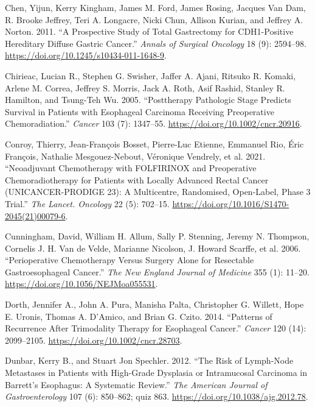 \documentclass[
  letterpaper,
]{scrbook}
\newlength{\cslhangindent}
\newenvironment{CSLReferences}[2] %
 {\begin{list}{}{%
  \setlength{\itemindent}{0pt}
  \setlength{\leftmargin}{0pt}
  \setlength{\parsep}{0pt}
  \ifodd #1
   \setlength{\leftmargin}{\cslhangindent}
   \setlength{\itemindent}{-1\cslhangindent}
  \fi
  \setlength{\itemsep}{#2\baselineskip}}}
 {\end{list}}
\begin{document}
\begin{CSLReferences}{1}{0}
Chen, Yijun, Kerry Kingham, James M. Ford, James Rosing, Jacques Van
Dam, R. Brooke Jeffrey, Teri A. Longacre, Nicki Chun, Allison Kurian,
and Jeffrey A. Norton. 2011. {``A Prospective Study of Total Gastrectomy
for {CDH1}-Positive Hereditary Diffuse Gastric Cancer.''} \emph{Annals
of Surgical Oncology} 18 (9): 2594--98.
\url{https://doi.org/10.1245/s10434-011-1648-9}.

Chirieac, Lucian R., Stephen G. Swisher, Jaffer A. Ajani, Ritsuko R.
Komaki, Arlene M. Correa, Jeffrey S. Morris, Jack A. Roth, Asif Rashid,
Stanley R. Hamilton, and Tsung-Teh Wu. 2005. {``Posttherapy Pathologic
Stage Predicts Survival in Patients with Esophageal Carcinoma Receiving
Preoperative Chemoradiation.''} \emph{Cancer} 103 (7): 1347--55.
\url{https://doi.org/10.1002/cncr.20916}.

Conroy, Thierry, Jean-François Bosset, Pierre-Luc Etienne, Emmanuel Rio,
Éric François, Nathalie Mesgouez-Nebout, Véronique Vendrely, et al.
2021. {``Neoadjuvant Chemotherapy with {FOLFIRINOX} and Preoperative
Chemoradiotherapy for Patients with Locally Advanced Rectal Cancer
({UNICANCER}-{PRODIGE} 23): A Multicentre, Randomised, Open-Label, Phase
3 Trial.''} \emph{The Lancet. Oncology} 22 (5): 702--15.
\url{https://doi.org/10.1016/S1470-2045(21)00079-6}.

Cunningham, David, William H. Allum, Sally P. Stenning, Jeremy N.
Thompson, Cornelis J. H. Van de Velde, Marianne Nicolson, J. Howard
Scarffe, et al. 2006. {``Perioperative Chemotherapy Versus Surgery Alone
for Resectable Gastroesophageal Cancer.''} \emph{The New England Journal
of Medicine} 355 (1): 11--20.
\url{https://doi.org/10.1056/NEJMoa055531}.

Dorth, Jennifer A., John A. Pura, Manisha Palta, Christopher G. Willett,
Hope E. Uronis, Thomas A. D'Amico, and Brian G. Czito. 2014. {``Patterns
of Recurrence After Trimodality Therapy for Esophageal Cancer.''}
\emph{Cancer} 120 (14): 2099--2105.
\url{https://doi.org/10.1002/cncr.28703}.

Dunbar, Kerry B., and Stuart Jon Spechler. 2012. {``The Risk of
Lymph-Node Metastases in Patients with High-Grade Dysplasia or
Intramucosal Carcinoma in {Barrett}'s Esophagus: A Systematic Review.''}
\emph{The American Journal of Gastroenterology} 107 (6): 850--862; quiz
863. \url{https://doi.org/10.1038/ajg.2012.78}.


\end{CSLReferences}
\end{document}

